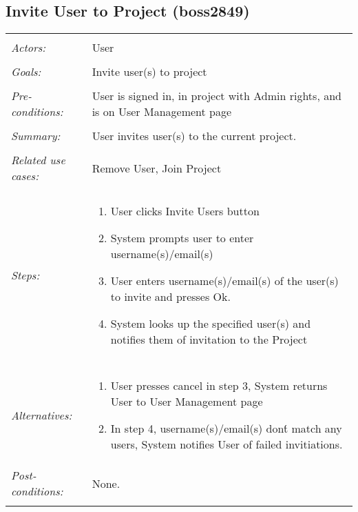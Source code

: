 \documentclass[11pt]{report}
\begin{document}
\subsection{Invite User to Project  (boss2849)}
\begin{tabular}{ p{2cm} p{12cm} }
 \hline
 \\
 \textit{Actors:} & User \\ 
 \\
 \textit{Goals:} & Invite user(s) to project \\
 \\
 \textit{Pre-conditions:} & User is signed in, in project with Admin rights, and is on User Management page \\
 \\
 \textit{Summary:} & User invites user(s) to the current project. \\ 
 \\
 \textit{Related use cases:} & Remove User, Join Project \\ 
 \\
 \textit{Steps:} & \begin{enumerate}
  \item User clicks Invite Users button
  \item System prompts user to enter username(s)/email(s)
  \item User enters username(s)/email(s) of the user(s) to invite and presses Ok.
  \item System looks up the specified user(s) and notifies them of invitation to the Project
 \end{enumerate} \\
 \\
 \textit{Alternatives:} & \begin{enumerate}
  \item User presses cancel in step 3, System returns User to User Management page
  \item In step 4, username(s)/email(s) don\'t match any users, System notifies User of failed invitiations.
 \end{enumerate} 
 \\
 \textit{Post-conditions:} & None. \\
 \\
\hline
\end{tabular}
\end{document}

